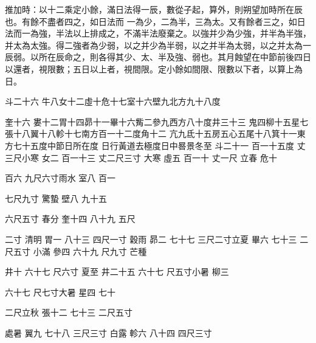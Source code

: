 \begin{pinyinscope}
 推加時：以十二乘定小餘，滿日法得一辰，數從子起，算外，則朔望加時所在辰也。有餘不盡者四之，如日法而
 一為少，二為半，三為太。又有餘者三之，如日法而一為強，半法以上排成之，不滿半法廢棄之。以強并少為少強，并半為半強，并太為太強。得二強者為少弱，以之并少為半弱，以之并半為太弱，以之并太為一辰弱。以所在辰命之，則各得其少、太、半及強、弱也。其月蝕望在中節前後四日以還者，視限數；五日以上者，視間限。定小餘如間限、限數以下者，以算上為日。


斗二十六
  牛八女十二虛十危十七室十六壁九北方九十八度


奎十六
 婁十二胃十四昴十一畢十六觜二參九西方八十度井三十三
 鬼四柳十五星七張十八翼十八軫十七南方百一十二度角十二
 亢九氐十五房五心五尾十八箕十一東方七十五度中節日所在度
 日行黃道去極度日中晷景冬至
 斗二十一
 百一十五度
 丈三尺小寒
 女二
 百一十三
 丈二尺三寸
 大寒
 虛五
 百一十
 丈一尺
 立春
 危十


百六
 九尺六寸雨水
 室八
 百一


七尺九寸
  驚蟄
 壁八
 九十五


六尺五寸
 春分
 奎十四
 八十九
 五尺


二寸
 清明
 胃一
  八十三
 四尺一寸
 穀雨
 昴二
 七十七
  三尺二寸立夏
 畢六
 七十三
 二尺五寸
 小滿
 參四
 六十九
 尺九寸
 芒種


井十
 六十七
 尺六寸
  夏至
 井二十五
 六十七
 尺五寸小暑
 柳三


六十七
 尺七寸大暑
 星四
 七十


二尺立秋
 張十二
  七十三
 二尺五寸


 處暑
 翼九
 七十八
  三尺三寸
 白露
 軫六
 八十四
 四尺三寸



\end{pinyinscope}
